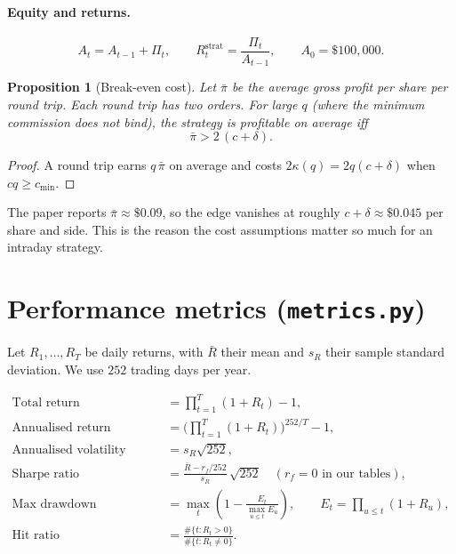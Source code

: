 \documentclass[11pt,a4paper]{article}
\newtheorem*{prop}{Proposition}
\newcommand{\1}{\mathbf{1}}
\begin{document}
\paragraph{Equity and returns.}
\begin{equation}
  A_t = A_{t-1} + \Pi_t, \qquad R^{\text{strat}}_t = \frac{\Pi_t}{A_{t-1}}, \qquad A_0 = \$100{,}000 .
\end{equation}

\begin{prop}[Break-even cost]
Let $\bar\pi$ be the average gross profit per share per round trip. Each round trip has two orders.
For large $q$ (where the minimum commission does not bind), the strategy is profitable on average iff
\[
  \bar\pi > 2\,(c + \delta) .
\]
\end{prop}
\begin{proof}
A round trip earns $q\,\bar\pi$ on average and costs $2\kappa(q) = 2q(c+\delta)$ when $cq\ge c_{\min}$.
\end{proof}
\noindent The paper reports $\bar\pi \approx \$0.09$, so the edge vanishes at roughly
$c+\delta \approx \$0.045$ per share and side. This is the reason the cost assumptions matter so much
for an intraday strategy.

\section{Performance metrics (\texttt{metrics.py})}

Let $R_1,\dots,R_T$ be daily returns, with $\bar R$ their mean and $s_R$ their sample standard deviation.
We use $252$ trading days per year.

\begin{align}
  \text{Total return} &= \prod_{t=1}^T (1+R_t) - 1, \\
  \text{Annualised return (CAGR)} &= \Big(\prod_{t=1}^T (1+R_t)\Big)^{252/T} - 1, \\
  \text{Annualised volatility} &= s_R \sqrt{252}, \\
  \text{Sharpe ratio} &= \frac{\bar R - r_f/252}{s_R}\,\sqrt{252} \quad (r_f = 0 \text{ in our tables}), \\
  \text{Max drawdown} &= \max_{t}\left(1 - \frac{E_t}{\max_{u\le t} E_u}\right), \qquad E_t = \prod_{u\le t}(1+R_u), \\
  \text{Hit ratio} &= \frac{\#\{t : R_t > 0\}}{\#\{t : R_t \neq 0\}} .
\end{align}
\end{document}
